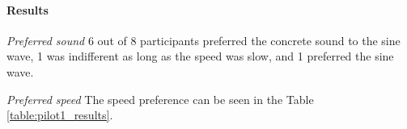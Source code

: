 \paragraph{Results}
\textit{Preferred sound} 6 out of 8 participants preferred the concrete sound to the sine wave, 1 was indifferent as long as the speed was slow, and 1 preferred the sine wave.

\textit{Preferred speed} The speed preference can be seen in the Table \ref{table:pilot1_results}.

\begin{figure}
	\centering
	

\end{figure}
